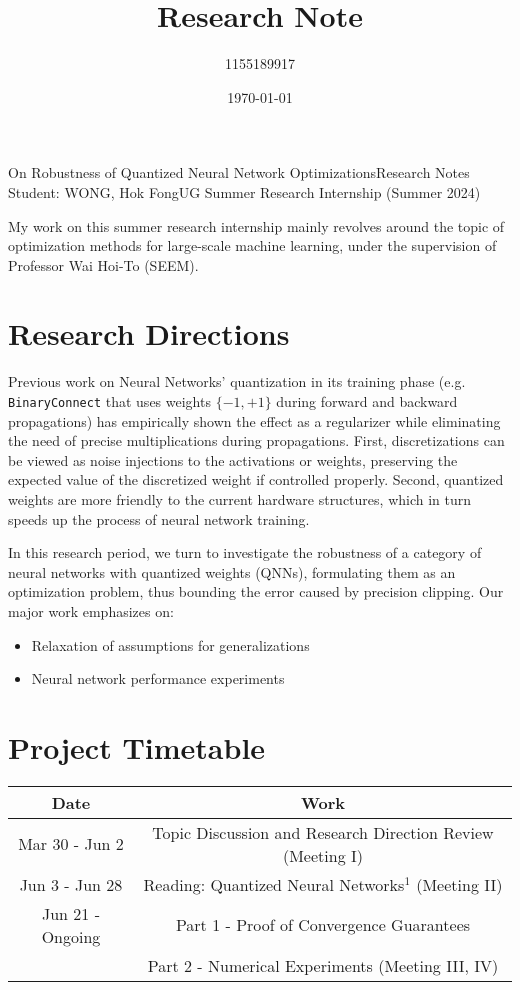 \documentclass[10pt,a4paper]{article}
\author{1155189917}
\title{Research Note}
\date{\today}
\begin{document}
\noindent On Robustness of Quantized Neural Network Optimizations\hfill Research Notes\\
Student: WONG, Hok Fong\hfill UG Summer Research Internship (Summer 2024)\\
\phantom{}\hrulefill

My work on this summer research internship mainly revolves around the topic of optimization methods for large-scale machine learning, under the supervision of Professor Wai Hoi-To (SEEM).

\section{Research Directions}

Previous work on Neural Networks' quantization in its training phase (e.g. \texttt{BinaryConnect} that uses weights $\{-1, +1\}$ during forward and backward propagations) has empirically shown the effect as a regularizer while eliminating the need of precise multiplications during propagations. First, discretizations can be viewed as noise injections to the activations or weights, preserving the expected value of the discretized weight if controlled properly. Second, quantized weights are more friendly to the current hardware structures, which in turn speeds up the process of neural network training.

In this research period, we turn to investigate the robustness of a category of neural networks with quantized weights (QNNs), formulating them as an optimization problem, thus bounding the error caused by precision clipping. Our major work emphasizes on:

\begin{itemize}
     \item Relaxation of assumptions for generalizations
     \item Neural network performance experiments
\end{itemize}

\section{Project Timetable}

\begin{table}[H]
     \centering
     \begin{tabular}{|c|c|}
          \hline
          \textbf{Date}    & \textbf{Work}                                              \\ \hline
          Mar 30 - Jun 2   & Topic Discussion and Research Direction Review (Meeting I) \\ \hline
          Jun 3 - Jun 28   & Reading: Quantized Neural Networks$^1$ (Meeting II)        \\ \hline
          Jun 21 - Ongoing & Part 1 - Proof of Convergence Guarantees                   \\
                           & Part 2 - Numerical Experiments   (Meeting III, IV)         \\ \hline
     \end{tabular}
\end{table}
\end{document}
